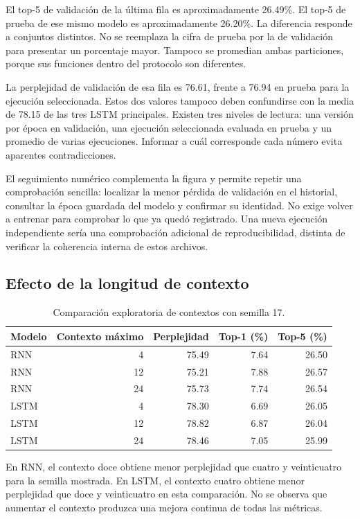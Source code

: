 El top-5 de validación de la última fila es aproximadamente 26.49\%. El top-5 de prueba de ese mismo modelo es aproximadamente 26.20\%. La diferencia responde a conjuntos distintos. No se reemplaza la cifra de prueba por la de validación para presentar un porcentaje mayor. Tampoco se promedian ambas particiones, porque sus funciones dentro del protocolo son diferentes.

La perplejidad de validación de esa fila es 76.61, frente a 76.94 en prueba para la ejecución seleccionada. Estos dos valores tampoco deben confundirse con la media de 78.15 de las tres LSTM principales. Existen tres niveles de lectura: una versión por época en validación, una ejecución seleccionada evaluada en prueba y un promedio de varias ejecuciones. Informar a cuál corresponde cada número evita aparentes contradicciones.

El seguimiento numérico complementa la figura y permite repetir una comprobación sencilla: localizar la menor pérdida de validación en el historial, consultar la época guardada del modelo y confirmar su identidad. No exige volver a entrenar para comprobar lo que ya quedó registrado. Una nueva ejecución independiente sería una comprobación adicional de reproducibilidad, distinta de verificar la coherencia interna de estos archivos.

\subsection{Efecto de la longitud de contexto}
\begin{table}[tb]
\caption{Comparación exploratoria de contextos con semilla 17.}
\centering
\begin{tabular}{lrrrr}
\toprule Modelo & Contexto máximo & Perplejidad & Top-1 (\%) & Top-5 (\%)\\\midrule
RNN & 4 & 75.49 & 7.64 & 26.50\\
RNN & 12 & 75.21 & 7.88 & 26.57\\
RNN & 24 & 75.73 & 7.74 & 26.54\\
LSTM & 4 & 78.30 & 6.69 & 26.05\\
LSTM & 12 & 78.82 & 6.87 & 26.04\\
LSTM & 24 & 78.46 & 7.05 & 25.99\\\bottomrule
\end{tabular}
\end{table}

En RNN, el contexto doce obtiene menor perplejidad que cuatro y veinticuatro para la semilla mostrada. En LSTM, el contexto cuatro obtiene menor perplejidad que doce y veinticuatro en esta comparación. No se observa que aumentar el contexto produzca una mejora continua de todas las métricas.

